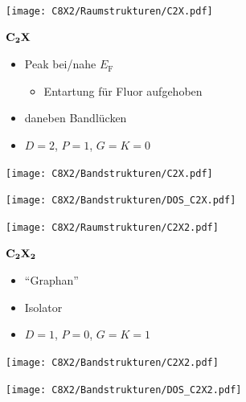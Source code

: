 \documentclass{beamer}
\newcommand \inlinetitle[1]{\begin{center} \color{MidnightBlue} \bf \Large #1 \end{center}}
\begin{document}
	\begin{frame}
		\begin{minipage}[b][0.48\textwidth][c]{0.48\textwidth}
			\texttt{[image: C8X2/Raumstrukturen/C2X.pdf]}
		\end{minipage}
		\hfill
		\begin{minipage}[b][0.48\textwidth][c]{0.48\textwidth}
			\inlinetitle{$\bf C_{\boldsymbol 2}X$}
			\begin{itemize}
				\item Peak bei/nahe $E_\text{F}$
				\begin{itemize}
					\item Entartung für Fluor aufgehoben
				\end{itemize}
				\item daneben Bandlücken
				\item $D = 2$, $P = 1$, $G = K = 0$
			\end{itemize}
		\end{minipage}
		\begin{minipage}{0.48\textwidth}
			\texttt{[image: C8X2/Bandstrukturen/C2X.pdf]}
		\end{minipage}
		\hfill
		\begin{minipage}{0.48\textwidth}
			\texttt{[image: C8X2/Bandstrukturen/DOS\_C2X.pdf]}
		\end{minipage}
	\end{frame}
	
	\begin{frame}
		\begin{minipage}[b][0.48\textwidth][c]{0.48\textwidth}
			\texttt{[image: C8X2/Raumstrukturen/C2X2.pdf]}
		\end{minipage}
		\hfill
		\begin{minipage}[b][0.48\textwidth][c]{0.48\textwidth}
			\inlinetitle{$\bf C_{\boldsymbol 2}X_{\boldsymbol 2}$}
			\begin{itemize}
				\item "`Graphan"'
				\item Isolator
				\item $D = 1$, $P = 0$, $G = K = 1$
			\end{itemize}
		\end{minipage}
		\begin{minipage}{0.48\textwidth}
			\texttt{[image: C8X2/Bandstrukturen/C2X2.pdf]}
		\end{minipage}
		\hfill
		\begin{minipage}{0.48\textwidth}
			\texttt{[image: C8X2/Bandstrukturen/DOS\_C2X2.pdf]}
		\end{minipage}
	\end{frame}
	
\end{document}
